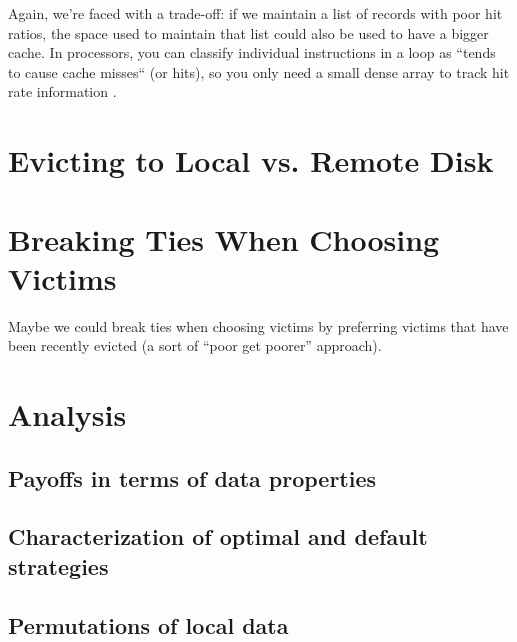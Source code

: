 \documentclass[12pt]{article}
\begin{document}
Again, we're faced with a trade-off: if we maintain a list of records with poor hit ratios, the space used to maintain that list could also be used to have a bigger cache.  In processors, you can classify individual instructions in a loop as ``tends to cause cache misses`` (or hits), so you only need a small dense array to track hit rate information \cite{automatic-cache-bypass}.





\section{Evicting to Local vs. Remote Disk}

\section{Breaking Ties When Choosing Victims}

Maybe we could break ties when choosing victims by preferring victims that have been recently evicted (a sort of ``poor get poorer'' approach).

\pagebreak
\section{Analysis}

\subsection{Payoffs in terms of data properties}

\subsection{Characterization of optimal and default strategies}

\subsection{Permutations of local data}
\end{document}
